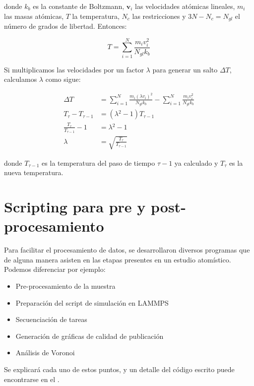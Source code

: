 donde $k_{b}$ es la constante de Boltzmann, $\mathbf{v}_{i}$ las velocidades atómicas lineales, $m_{i}$ las masas atómicas, $T$ la temperatura, $N_{c}$ las restricciones y $3N-N_{c} = N_{gl}$ el número de grados de libertad. Entonces:

\begin{equation}
T = \sum_{i=1}^{N}\frac{m_{i}v_{i}^{2}}{N_{gl}k_{b}}
\end{equation}

Si multiplicamos las velocidades por un factor $\lambda$ para generar un salto $\Delta{}T$, calculamos $\lambda$ como sigue:

\begin{align}
\Delta{}T &= \sum_{i=1}^{N}\frac{m_{i}(\lambda{}v_{i})^{2}}{N_{gl}k_{b}} - \sum_{i=1}^{N}\frac{m_{i}v_{i}^{2}}{N_{gl}k_{b}}\\
T_{\tau} - T_{\tau{}-1} &= (\lambda{}^{2}-1)T_{\tau{}-1}\\
\frac{T_{\tau}}{T_{\tau{}-1}} - 1 &= \lambda{}^{2}-1 \\
\lambda{} &= \sqrt{\frac{T_{\tau{}}}{T_{\tau{}-1}}}
\end{align}

donde $T_{\tau{}-1}$ es la temperatura del paso de tiempo $\tau{}-1$ ya calculado y $T_{\tau}$ es la nueva temperatura.

\section{Scripting para pre y post-procesamiento}


Para facilitar el procesamiento de datos, se desarrollaron diversos programas que de alguna manera asisten en las etapas presentes en un estudio atomístico. Podemos diferenciar por ejemplo:

\begin{itemize}
 \item Pre-procesamiento de la muestra
 \item Preparación del script de simulación en LAMMPS
 \item Secuenciación de tareas
 \item Generación de gráficas de calidad de publicación
 \item Análisis de Voronoi
\end{itemize}

Se explicará cada uno de estos puntos, y un detalle del código escrito puede encontrarse en el .

